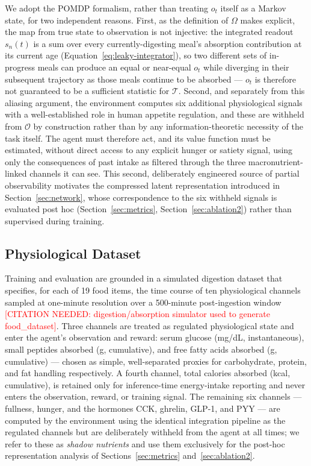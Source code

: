 \documentclass[10pt,twocolumn]{article}
\newcommand{\todocite}[1]{\textcolor{red}{[CITATION NEEDED: #1]}}
\begin{document}
We adopt the POMDP formalism, rather than treating $o_t$ itself as a Markov state, for two independent reasons. First, as the definition of $\Omega$ makes explicit, the map from true state to observation is not injective: the integrated readout $s_n(t)$ is a sum over every currently-digesting meal's absorption contribution at its current age (Equation~\eqref{eq:leaky-integrator}), so two different sets of in-progress meals can produce an equal or near-equal $o_t$ while diverging in their subsequent trajectory as those meals continue to be absorbed — $o_t$ is therefore not guaranteed to be a sufficient statistic for $\mathcal{T}$. Second, and separately from this aliasing argument, the environment computes six additional physiological signals with a well-established role in human appetite regulation, and these are withheld from $\mathcal{O}$ by construction rather than by any information-theoretic necessity of the task itself. The agent must therefore act, and its value function must be estimated, without direct access to any explicit hunger or satiety signal, using only the consequences of past intake as filtered through the three macronutrient-linked channels it can see. This second, deliberately engineered source of partial observability motivates the compressed latent representation introduced in Section~\ref{sec:network}, whose correspondence to the six withheld signals is evaluated post hoc (Section~\ref{sec:metrics}, Section~\ref{sec:ablation2}) rather than supervised during training.

\subsection{Physiological Dataset}
\label{sec:dataset}

Training and evaluation are grounded in a simulated digestion dataset that specifies, for each of 19 food items, the time course of ten physiological channels sampled at one-minute resolution over a 500-minute post-ingestion window \todocite{digestion/absorption simulator used to generate food\_dataset}. Three channels are treated as regulated physiological state and enter the agent's observation and reward: serum glucose (mg/dL, instantaneous), small peptides absorbed (g, cumulative), and free fatty acids absorbed (g, cumulative) — chosen as simple, well-separated proxies for carbohydrate, protein, and fat handling respectively. A fourth channel, total calories absorbed (kcal, cumulative), is retained only for inference-time energy-intake reporting and never enters the observation, reward, or training signal. The remaining six channels — fullness, hunger, and the hormones CCK, ghrelin, GLP-1, and PYY — are computed by the environment using the identical integration pipeline as the regulated channels but are deliberately withheld from the agent at all times; we refer to these as \emph{shadow nutrients} and use them exclusively for the post-hoc representation analysis of Sections~\ref{sec:metrics} and~\ref{sec:ablation2}.
\end{document}
